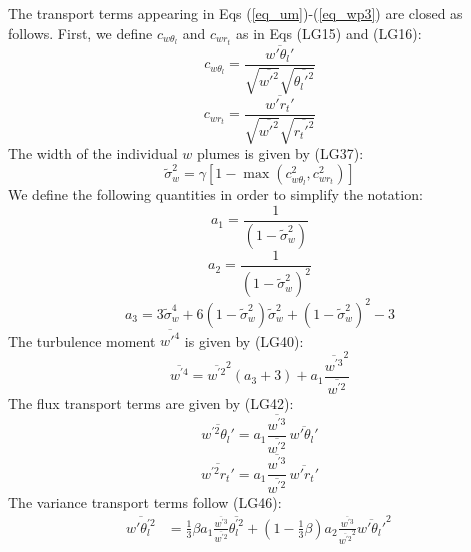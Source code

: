 \documentclass[11pt,fleqn]{article}
\begin{document}
The transport terms appearing in Eqs (\ref{eq_um})-(\ref{eq_wp3}) are
closed as follows. First, we define $c_{w\theta_l}$ and $c_{wr_t}$
as in Eqs (LG15) and (LG16):
%
\begin{equation}
\label{eq_cwthl}
c_{w\theta_l} 
= \frac{ \overline{w'\theta_l'} }
       { \sqrt{\overline{w'^2}}\sqrt{\overline{\theta_l'^2}} }
\end{equation}
%
\begin{equation}
\label{eq_cwrt}
c_{wr_t} 
= \frac{ \overline{w'r_t'} }
       { \sqrt{\overline{w'^2}}\sqrt{\overline{r_t'^2}} }
\end{equation}
%
The width of the individual $w$ plumes is given by (LG37):
%
\begin{equation}
\label{eq_sc}
\tilde{\sigma}^2_w 
= \gamma \left[ 1 - \max\left( c^2_{w\theta_l}, c^2_{wr_t} \right) \right]
\end{equation}
%
We define the following quantities in order to simplify the notation:
% 
\begin{equation}
\label{eq_a1}
a_1 = \frac{1}{ (1-\tilde{\sigma}_w^2) }
\end{equation}
%
\begin{equation}
\label{eq_a2}
a_2 = \frac{1}{ (1-\tilde{\sigma}_w^2)^2 }
\end{equation}
%
\begin{equation}
\label{eq_a3}
a_3 = 3 \tilde{\sigma}_w^4 
      + 6 ( 1 - \tilde{\sigma}_w^2 ) \tilde{\sigma}_w^2
      + ( 1 - \tilde{\sigma}_w^2 )^2 
      - 3
\end{equation}
%
The turbulence moment $\overline{w'^4}$ is given by (LG40):
%
\begin{equation}
\label{eq_wp4}
\overline{w^{'4}}
= \overline{w^{'2}}^2
  \left( a_3 + 3 \right)
+ a_1 \frac{ \overline{w^{'3}}^2 }{ \overline{w^{'2}} }
\end{equation}
%
The flux transport terms are given by (LG42):
%
\begin{equation}
\label{eq_wp2thlp}
\overline{w^{'2}\theta_l'}
= a_1 \frac{\overline{w^{'3}}}{\overline{w^{'2}}} \,
  \overline{w'\theta_l'}
\end{equation}
%
\begin{equation}
\label{eq_wp2rtp}
\overline{w^{'2}r_t'}
= a_1 \frac{\overline{w^{'3}}}{\overline{w^{'2}}} \,
  \overline{w'r_t'}
\end{equation}
%
The variance transport terms follow (LG46):
%
\begin{equation}
\label{eq_wpthlp2}
\begin{split}
\overline{w'\theta_l^{'2}}
& = 
    \frac{1}{3} \beta
    a_1 \frac{\overline{w^{'3}}}{\overline{w^{'2}}} \overline{\theta_l^{'2}}
  + \left( 1 - \frac{1}{3}\beta \right)
    a_2 \frac{\overline{w^{'3}}}{\overline{w^{'2}}^2} \overline{w'\theta_l'}^2 \,
\end{split}
\end{equation}
\end{document}
